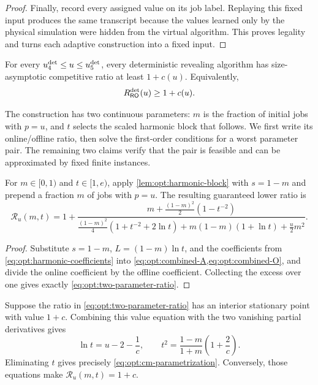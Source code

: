 \begin{proof}
Finally, record every assigned value on its job label.  Replaying this fixed
input produces the same transcript because the values learned only by the
physical simulation were hidden from the virtual algorithm.  This proves
legality and turns each adaptive construction into a fixed input.
\end{proof}

\begin{proposition}
\label{prop:opt:middle-lower}
For every $u_{4}^{\mathrm{det}}\le u\le u_{5}^{\mathrm{det}}$, every deterministic revealing
algorithm has size-asymptotic competitive ratio at least $1+c(u)$.
Equivalently,
\begin{equation}
 R_{\mathsf{RO}}^{\mathrm{det}}(u)\ge1+c(u).
 \label{eq:opt:middle-lower-final}
\end{equation}
\end{proposition}

The construction has two continuous parameters: $m$ is the fraction of
initial jobs with $p=u$, and $t$ selects the scaled harmonic block that
follows.
We first write its online/offline ratio, then solve the first-order conditions
for a worst parameter pair.  The remaining two claims verify that the pair is
feasible and can be approximated by fixed finite instances.

\begin{claim}
\label{clm:opt:combined-ratio}
For $m\in[0,1)$ and $t\in[1,e)$, apply
\cref{lem:opt:harmonic-block} with $s=1-m$ and prepend a fraction $m$ of jobs
with $p=u$.  The resulting guaranteed lower ratio is
\begin{equation}
 \mathcal R_u(m,t)=1+
 \frac{m+\frac{(1-m)^2}{2}(1-t^{-2})}
 {\frac{(1-m)^2}{4}(1+t^{-2}+2\ln t)
  +m(1-m)(1+\ln t)+\frac u2m^2}.
 \label{eq:opt:two-parameter-ratio}
\end{equation}
\end{claim}

\begin{proof}
Substitute $s=1-m$, $L=(1-m)\ln t$, and the coefficients from
\cref{eq:opt:harmonic-coefficients} into
\cref{eq:opt:combined-A,eq:opt:combined-O}, and divide the online coefficient
by the offline coefficient.  Collecting the excess over one gives exactly
\cref{eq:opt:two-parameter-ratio}.
\end{proof}

\begin{claim}
\label{clm:opt:cm-stationary-point}
Suppose the ratio in \cref{eq:opt:two-parameter-ratio} has an interior stationary
point with value $1+c$.  Combining this value equation with the two
vanishing partial derivatives gives
\begin{equation}
 \ln t=u-2-\frac1c,
 \qquad
 t^2=\frac{1-m}{1+m}\left(1+\frac2c\right).
 \label{eq:opt:cm-stationarity}
\end{equation}
Eliminating $t$ gives precisely
\cref{eq:opt:cm-parametrization}.  Conversely, those equations make
$\mathcal R_u(m,t)=1+c$.
\end{claim}


